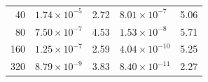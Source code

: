 \documentclass[10pt]{beamer}
\begin{document}
\begin{frame}
\begin{table}
\begin{tabular}{r*{4}l}
      40    & \( 1.74 \times 10^{-5} \)     & 2.72                          & \( 8.01 \times 10^{ -7} \) & 5.06  \\
      80    & \( 7.50 \times 10^{-7} \)     & 4.53                          & \( 1.53 \times 10^{ -8} \) & 5.71  \\
      160   & \( 1.25 \times 10^{-7} \)     & 2.59                          & \( 4.04 \times 10^{-10} \) & 5.25  \\
      320   & \( 8.79 \times 10^{-9} \)     & 3.83                          & \( 8.40 \times 10^{-11} \) & 2.27  \\
      \bottomrule
    \end{tabular}
  \end{table}
\end{frame}
\end{document}
